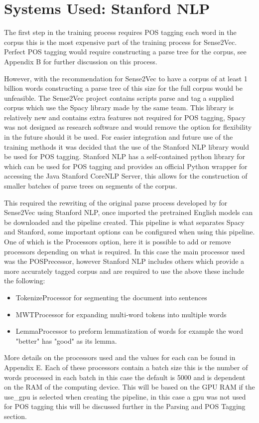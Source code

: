 \section{Systems Used: Stanford NLP}
The first step in the training process requires POS tagging each word in the corpus this is the most expensive part of the training process for Sense2Vec. Perfect POS tagging would require constructing a parse tree for the corpus, see Appendix B for further discussion on this process.

However, with the recommendation for Sense2Vec to have a corpus of at least 1 billion words constructing a parse tree of this size for the full corpus would be unfeasible. The Sense2Vec project contains scripts parse and tag a supplied corpus which use the Spacy library made by the same team. This library is relatively new and contains extra features not required for POS tagging, Spacy was not designed as research software and would remove the option for flexibility in the future should it be used. For easier integration and future use of the training methods it was decided that the use of the Stanford NLP library would be used for POS tagging. Stanford NLP has a self-contained python library for which can be used for POS tagging and provides an official Python wrapper for accessing the Java Stanford CoreNLP Server, this allows for the construction of smaller batches of parse trees on segments of the corpus.

This required the rewriting of the original parse process developed by for Sense2Vec using Stanford NLP, once imported the pretrained English models can be downloaded and the pipeline created. This pipeline is what separates Spacy and Stanford, some important options can be configured when using this pipeline. One of which is the Processors option, here it is possible to add or remove processors depending on what is required. In this case the main processor used was the POSPrecessor, however Stanford NLP includes others which provide a more accurately tagged corpus and are required to use the above these include the following:

\begin{itemize}
  \item TokenizeProcessor for segmenting the document into sentences
  \item MWTProcessor for expanding multi-word tokens into multiple words
  \item LemmaProcessor to preform lemmatization of words for example the word "better" has "good" as its lemma.
\end{itemize}
More details on the processors used and the values for each can be found in Appendix E. Each of these processors contain a batch size this is the number of words processed in each batch in this case the default is 5000 and is dependent on the RAM of the computing device. This will be based on the GPU RAM if the use\_gpu is selected when creating the pipeline, in this case a gpu was not used for POS tagging this will be discussed further in the Parsing and POS Tagging section.

